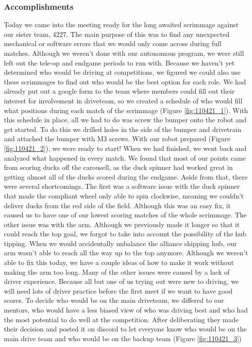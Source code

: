 \subsubsection*{Accomplishments}
Today we came into the meeting ready for the long awaited scrimmage against our sister team, 4227. The main purpose of this was to find any unexpected mechanical or software errors that we would only come across during full matches. Although we weren’t done with our autonomous program, we were still left out the tele-op and endgame periods to run with. Because we haven’t yet determined who would be driving at competitions, we figured we could also use these scrimmages to find out who would be the best option for each role. We had already put out a google form to the team where members could fill out their interest for involvement in driveteam, so we created a schedule of who would fill what positions during each match of the scrimmage (Figure \ref{fig:110421_1}). With this schedule in place, all we had to do was screw the bumper onto the robot and get started. To do this we drilled holes in the side of the bumper and drivetrain and attached the bumper with M3 screws. With our robot prepared (Figure \ref{fig:110421_2}), we were ready to start!
When we had finished, we went back and analyzed what happened in every match. We found that most of our points came from scoring ducks off the carousell, as the duck spinner had worked great in getting almost all of the ducks scored during the endgame. Aside from that, there were several shortcomings. The first was a software issue with the duck spinner that made the compliant wheel only able to spin clockwise, meaning we couldn’t deliver ducks from the red side of the field. Although this was an easy fix, it caused us to have one of our lowest scoring matches of the whole scrimmage. The other issue was with the arm. Although we previously made it longer so that it could reach the top goal, we forgot to take into account the possibility of the hub tipping. When we would accidentally unbalance the alliance shipping hub, our arm wasn’t able to reach all the way up to the top anymore. Although we weren't able to fix this today, we have a couple ideas of how to make it work without making the arm too long. Many of the other issues were caused by a lack of driver experience. Because all but one of us trying out were new to driving, we will need lots of driver practice before the first meet if we want to have good scores. 
To decide who would be on the main driveteam, we differed to our mentors, who would have a less biased view of who was driving best and who had the most potential to do well at the competition. After deliberating they made their decision and posted it on discord to let everyone know who would be on the main drive team and who would be on the backup team (Figure \ref{fig:110421_3})


